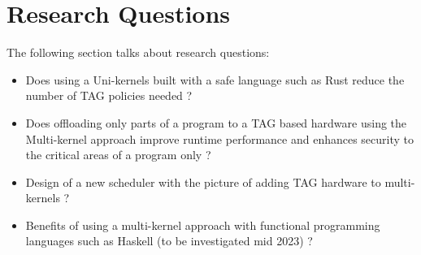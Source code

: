 
\chapter{Research Questions}  %

The following section talks about research questions: 

\begin{itemize}

    \item Does using a Uni-kernels built with a safe language such as Rust reduce the number of TAG policies needed ? 
    \item Does offloading only parts of a program to a TAG based hardware using the Multi-kernel approach improve runtime performance 
    and enhances security to the critical areas of a program only ? 
    \item Design of a new scheduler with the picture of adding TAG hardware to multi-kernels ?
    \item Benefits of using a multi-kernel approach with functional programming languages such as Haskell (to be investigated mid 2023) ?
\end{itemize}